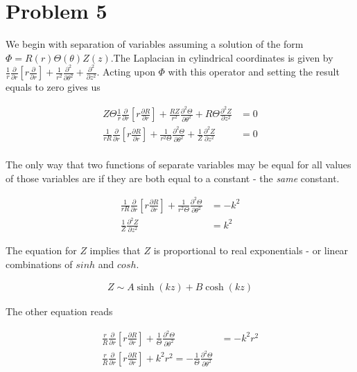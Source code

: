 \documentclass[paper=a4, fontsize=11pt]{scrartcl} %
\numberwithin{equation}{section} %
\numberwithin{figure}{section} %
\numberwithin{table}{section} %
\begin{document}




\section{Problem 5}

We begin with separation of variables assuming a solution of the form $\Phi  = R(r)\Theta(\theta)Z(z)$.The Laplacian in cylindrical coordinates is given by $\frac{1}{r}\frac{\partial}{\partial r}\left[r\frac{\partial}{\partial r}\right] + \frac{1}{r^2}\frac{\partial^2}{\partial \theta^2} + \frac{\partial^2}{\partial z^2}$. Acting upon $\Phi$ with this operator and setting the result equals to zero gives us

\begin{align}
Z\Theta\frac{1}{r} \frac{\partial}{\partial r}\left[r\frac{\partial R}{\partial r}\right] + \frac{RZ}{r^2}\frac{\partial^2 \Theta}{\partial \theta^2} + R\Theta\frac{\partial^2 Z}{\partial z^2} &= 0 \\
\frac{1}{rR}\frac{\partial}{\partial r}\left[r\frac{\partial R}{\partial r}\right] + \frac{1}{r^2 \Theta}\frac{\partial^2 \Theta}{\partial \theta^2} + \frac{1}{Z}\frac{\partial^2 Z}{\partial z^2} &= 0 \\
\end{align} 

The only way that two functions of separate variables may be equal for all values of those variables are if they are both equal to a constant - the \textit{same} constant.

\begin{align}
\frac{1}{rR}\frac{\partial}{\partial r}\left[r\frac{\partial R}{\partial r}\right] + \frac{1}{r^2 \Theta}\frac{\partial^2 \Theta}{\partial \theta^2} &= -k^2 \\ 
\frac{1}{Z}\frac{\partial^2 Z}{\partial z^2} &= k^2
\end{align}

The equation for $Z$ implies that $Z$ is proportional to real exponentials - or linear combinations of $sinh$ and $cosh$.

\begin{align}
Z \sim A\sinh(kz) + B\cosh(kz)
\end{align} 

The other equation reads

\begin{align}
\frac{r}{R} \frac{\partial}{\partial r}\left[r\frac{\partial R}{\partial r}\right] + \frac{1}{\Theta}\frac{\partial^2 \Theta}{\partial \theta^2} &= -k^2r^2 \\
\frac{r}{R}\frac{\partial}{\partial r}\left[r\frac{\partial R}{\partial r}\right] + k^2 r^2 = -\frac{1}{\Theta}\frac{\partial^2 \Theta}{\partial \theta^2} \\
\end{align}
\end{document}
